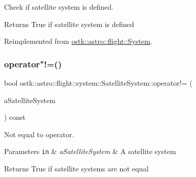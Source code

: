 Check if satellite system is defined. 

\begin{DoxyReturn}{Returns}
True if satellite system is defined 
\end{DoxyReturn}


Reimplemented from \hyperlink{classostk_1_1astro_1_1flight_1_1_system_a45d6ad6bca50c0d9cb9b50135ed2efa3}{ostk\+::astro\+::flight\+::\+System}.

\mbox{\label{classostk_1_1astro_1_1flight_1_1system_1_1_satellite_system_a67e71754b00cc21140555fd3632705e0}} 
\subsubsection{\texorpdfstring{operator"!=()}{operator!=()}}
{\footnotesize\ttfamily bool ostk\+::astro\+::flight\+::system\+::\+Satellite\+System\+::operator!= (\begin{DoxyParamCaption}\item[{const \hyperlink{classostk_1_1astro_1_1flight_1_1system_1_1_satellite_system}{Satellite\+System} \&}]{a\+Satellite\+System }\end{DoxyParamCaption}) const}



Not equal to operator. 


\begin{DoxyParams}[1]{Parameters}
\mbox{\tt in}  & {\em a\+Satellite\+System} & A satellite system \\
\hline
\end{DoxyParams}
\begin{DoxyReturn}{Returns}
True if satellite systems are not equal 
\end{DoxyReturn}
\mbox{\label{classostk_1_1astro_1_1flight_1_1system_1_1_satellite_system_aa74775f808a686c2452a9868d72ab5ef}} 
